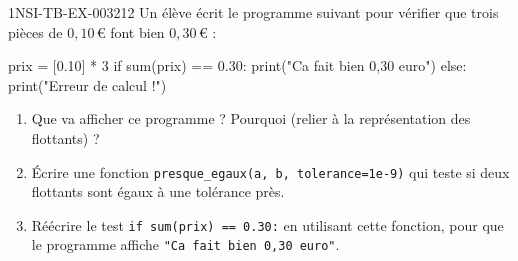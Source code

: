 \begin{exercice}{1NSI-TB-EX-003}{2}{12}
Un élève écrit le programme suivant pour vérifier que trois pièces de $0{,}10$\,€ font bien
$0{,}30$\,€ :
\begin{python}
prix = [0.10] * 3
if sum(prix) == 0.30:
    print("Ca fait bien 0,30 euro")
else:
    print("Erreur de calcul !")
\end{python}
\begin{enumerate}
  \item Que va afficher ce programme ? Pourquoi (relier à la représentation des flottants) ?
  \item Écrire une fonction \lstinline{presque_egaux(a, b, tolerance=1e-9)} qui teste si deux
  flottants sont égaux à une tolérance près.
  \item Réécrire le test \lstinline{if sum(prix) == 0.30:} en utilisant cette fonction, pour
  que le programme affiche \lstinline{"Ca fait bien 0,30 euro"}.
\end{enumerate}
\end{exercice}
